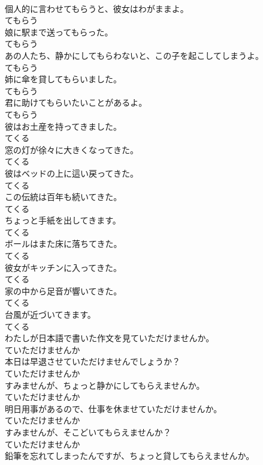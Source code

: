 \documentclass[8pt]{extreport}
\begin{document}
\begin{CJK}{UTF8}{min}
\\	個人的に言わせてもらうと、彼女はわがままよ。	
\\	てもらう
\\	娘に駅まで送ってもらった。	
\\	てもらう
\\	あの人たち、静かにしてもらわないと、この子を起こしてしまうよ。	
\\	てもらう
\\	姉に傘を貸してもらいました。	
\\	てもらう
\\	君に助けてもらいたいことがあるよ。	
\\	てもらう
\\	彼はお土産を持ってきました。	
\\	てくる
\\	窓の灯が徐々に大きくなってきた。	
\\	てくる
\\	彼はベッドの上に這い戻ってきた。	
\\	てくる
\\	この伝統は百年も続いてきた。	
\\	てくる
\\	ちょっと手紙を出してきます。	
\\	てくる
\\	ボールはまた床に落ちてきた。	
\\	てくる
\\	彼女がキッチンに入ってきた。	
\\	てくる
\\	家の中から足音が響いてきた。	
\\	てくる
\\	台風が近づいてきます。	
\\	てくる
\\	わたしが日本語で書いた作文を見ていただけませんか。	
\\	ていただけませんか
\\	本日は早退させていただけませんでしょうか？	
\\	ていただけませんか
\\	すみませんが、ちょっと静かにしてもらえませんか。	
\\	ていただけませんか
\\	明日用事があるので、仕事を休ませていただけませんか。	
\\	ていただけませんか
\\	すみませんが、そこどいてもらえませんか？	
\\	ていただけませんか
\\	鉛筆を忘れてしまったんですが、ちょっと貸してもらえませんか。	

\end{CJK}
\end{document}
